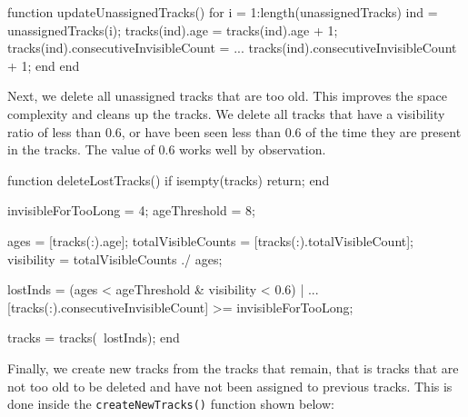 \documentclass[10pt,a4paper]{article}
\begin{document}
\begin{samepage}
\begin{verbatimtab}
function updateUnassignedTracks()
	for i = 1:length(unassignedTracks)
		ind = unassignedTracks(i);
		tracks(ind).age = tracks(ind).age + 1;
		tracks(ind).consecutiveInvisibleCount = ...
			tracks(ind).consecutiveInvisibleCount + 1;
	end
end
\end{verbatimtab}
\end{samepage}

Next, we delete all unassigned tracks that are too old. This improves the space complexity and cleans up the tracks. We delete all tracks that have a visibility ratio of less than 0.6, or have been seen less than 0.6 of the time they are present in the tracks. The value of 0.6 works well by observation.

\begin{verbatimtab}
function deleteLostTracks()
	if isempty(tracks)
		return;
	end

	invisibleForTooLong = 4;
	ageThreshold = 8;

	ages = [tracks(:).age];
	totalVisibleCounts = [tracks(:).totalVisibleCount];
	visibility = totalVisibleCounts ./ ages;

	lostInds = (ages < ageThreshold & visibility < 0.6) | ...
		[tracks(:).consecutiveInvisibleCount] >= invisibleForTooLong;

	tracks = tracks(~lostInds);
end
\end{verbatimtab}

Finally,  we create new tracks from the tracks that remain, that is tracks that are not too old to be deleted and have not been assigned to previous tracks. This is done inside the \texttt{createNewTracks()} function shown below:
\end{document}
